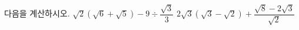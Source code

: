다음을 계산하시오.
 $\sqrt{2}(\sqrt{6}+\sqrt{5})-9\div\dfrac{\sqrt{3}}{3}$
 $2\sqrt{3}(\sqrt{3}-\sqrt{2})+\dfrac{\sqrt{8}-2\sqrt{3}}{\sqrt{2}}$
